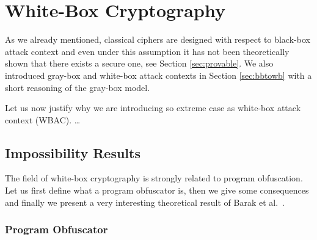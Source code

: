 
\section{White-Box Cryptography}


As we already mentioned, classical ciphers are designed with respect to black-box attack context and even under this assumption it has not been theoretically shown that there exists a secure one, see Section \ref{sec:provable}. We also introduced gray-box and white-box attack contexts in Section \ref{sec:bbtowb} with a short reasoning of the gray-box model.

Let us now justify why we are introducing so extreme case as white-box attack context (WBAC). \ldots



\subsection{Impossibility Results}
\label{sec:impos}

The field of white-box cryptography is strongly related to program obfuscation. Let us first define what a program obfuscator is, then we give some consequences and finally we present a very interesting theoretical result of Barak et al.\ \cite{barak2001possibility}.

\subsubsection{Program Obfuscator}
	
